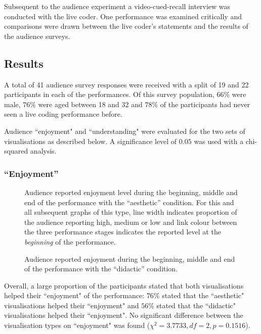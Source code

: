 \documentclass{sig-alternate}
\begin{document}
Subsequent to the audience experiment a video-cued-recall interview was conducted with the live coder. One performance was examined critically and comparisons were drawn between the live coder's statements and the results of the audience surveys.

\subsection{Results}

A total of 41 audience survey responses were received with a split of 19 and 22 participants in each of the performances. Of this survey population, $66\%$ were male, $76\%$ were aged between 18 and 32 and $78\%$ of the participants had never seen a live coding performance before.

Audience ``enjoyment" and ``understanding" were evaluated for the two sets of visualisations as described below. A significance level of $0.05$ was used with a chi-squared analysis.

\subsubsection{``Enjoyment''}

\begin{figure}
\centering
{}
\caption{Audience reported enjoyment level during the beginning, middle and end of the performance with the ``aesthetic'' condition. For this and all subsequent graphs of this type, line width indicates proportion of the audience reporting high, medium or low and link colour between the three performance stages indicates the reported level at the \emph{beginning} of the performance.}
\label{fig:aesthetic-enjoyment}
\end{figure}

\begin{figure}
\centering
{}
\caption{Audience reported enjoyment during the beginning, middle and end of the performance with the ``didactic'' condition.}
\label{fig:didactic-enjoyment}
\end{figure}

Overall, a large proportion of the participants stated that both visualisations helped their ``enjoyment" of the performance: $76\%$ stated that the ``aesthetic" visualisations helped their ``enjoyment" and $56\%$ stated that the ``didactic" visualisations helped their ``enjoyment". No significant difference between the visualisation types on ``enjoyment" was found ($\chi^2=3.7733,df=2,p=0.1516$).
\end{document}
